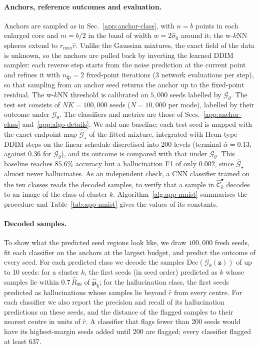 \paragraph{Anchors, reference outcomes and evaluation.}
Anchors are sampled as in Sec.~\ref{app:anchor-class}, with $n = b$ points in each enlarged core
and $m = b/2$ in the band of width $w = 2\hat\sigma_0$ around it; the w-$k$NN spheres extend to
$r_{\max}\hat r$. Unlike the Gaussian mixtures, the exact field of the data is unknown, so the
anchors are pulled back by inverting the learned DDIM sampler: each reverse step starts from the
noise prediction at the current point and refines it with $n_{\text{fp}} = 2$ fixed-point
iterations (3 network evaluations per step), so that sampling from an anchor seed returns the anchor
up to the fixed-point residual. The w-$k$NN threshold is calibrated on $5{,}000$ seeds labelled by
$\mathcal{G}_\theta$. The test set consists of $N K = 100{,}000$ seeds ($N = 10{,}000$ per mode),
labelled by their outcome under $\mathcal{G}_\theta$. The classifiers and metrics are those of
Secs.~\ref{app:anchor-class} and~\ref{app:algo-details}. We add one baseline: each test seed is
mapped with the exact endpoint map $\hat{\mathcal{G}}_\star$ of the fitted mixture, integrated with
Heun-type DDIM steps on the linear schedule discretised into 200 levels (terminal
$\bar\alpha = 0.13$, against $0.36$ for $\mathcal{G}_\theta$), and its outcome is compared with that
under $\mathcal{G}_\theta$. This baseline reaches $85.6\%$ accuracy but a hallucination F1 of only
$0.002$, since $\hat{\mathcal{G}}_\star$ almost never hallucinates. As an independent check, a CNN
classifier trained on the ten classes reads the decoded samples, to verify that a sample in
$\hat{\mathcal{C}}_k^\bullet$ decodes to an image of the class of cluster $k$.
Algorithm~\ref{alg:app-mnist} summarises the procedure and Table~\ref{tab:app-mnist} gives the
values of its constants.

\paragraph{Decoded samples.}
To show what the predicted seed regions look like, we draw $100{,}000$ fresh seeds, fit each
classifier on the anchors at the largest budget, and predict the outcome of every seed. For each
predicted class we decode the samples $\mathrm{Dec}(\mathcal{G}_\theta(\boldsymbol{z}))$ of up to 10
seeds: for a cluster $k$, the first seeds (in seed order) predicted as $k$ whose samples lie within
$0.7\,\hat R_{99}$ of $\hat{\boldsymbol{\mu}}_k$; for the hallucination class, the first seeds
predicted as hallucinations whose samples lie beyond $\hat r$ from every centre. For each classifier
we also report the precision and recall of its hallucination predictions on these seeds, and the
distance of the flagged samples to their nearest centre in units of $\hat r$. A classifier that
flags fewer than 200 seeds would have its highest-margin seeds added until 200 are flagged; every
classifier flagged at least 637.


